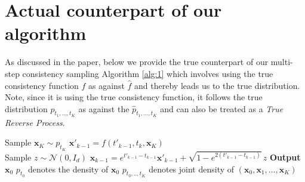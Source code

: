 \documentclass[11pt]{article}
\def\rvx{{\mathbf{x}}}
\begin{document}



\newpage
\tableofcontents
\newpage

\newpage
\appendix

\section{Actual counterpart of our algorithm}
As discussed in the paper, below we provide the true counterpart of our multi-step consistency sampling Algorithm \ref{alg:1} which involves using the true consistency function $f$ as against $\hat{f}$ and thereby leads us to the true distribution. Note, since it is using the true consistency function, it follows the true distribution $p_{t_1,...,t_K}$ as against the $\hat{p}_{t_1,...,t_K}$ and can also be treated as a \textit{True Reverse Process}.
\noindent
\begin{algorithm}[H]
\caption{Multi-Step Consistency Generation}
\label{alg:2}
\begin{algorithmic}[1]
\STATE Sample ${\rvx}_K \sim {p}_{t_K}$
    \STATE ${\rvx}'_{k-1} = {f}(t'_{k-1}, t_k, {\rvx}_K)$ \\
    \STATE Sample $z \sim \mathcal{N}(0, I_d)$
    \STATE ${\rvx}_{k-1} = e^{t'_{k-1} - t_{k-1}} {\rvx}'_{k-1} + \sqrt{1 - e^{2(t'_{k-1} - t_{k-1})}}\, z$ 
\ENDFOR
\STATE \textbf{Output} ${\rvx}_0$
\STATE ${p}_{t_0}$ denotes the density of ${\rvx}_0$
\STATE ${p}_{t_0,.., t_K}$ denotes joint density of $({\rvx}_0, {\rvx}_1, \ldots, {\rvx}_K)$
\end{algorithmic}
\end{algorithm}
\end{document}
